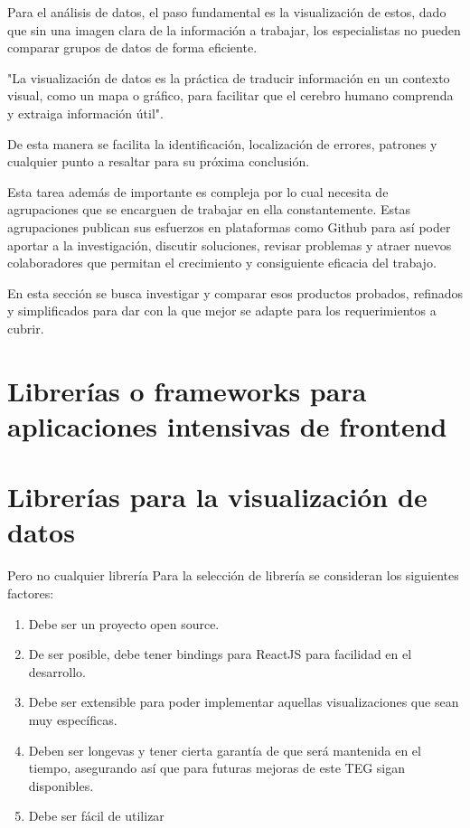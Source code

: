 Para el análisis de datos, el paso fundamental es la visualización de estos, dado que sin una imagen clara de la información a trabajar, los especialistas no pueden comparar grupos de datos de forma eficiente. 

"La visualización de datos es la práctica de traducir información en un contexto visual, como un mapa o gráfico, para facilitar que el cerebro humano comprenda y extraiga información útil". \cite{DefinitionDataViz}

De esta manera se facilita la identificación, localización de errores, patrones y cualquier punto a resaltar para su próxima conclusión.

Esta tarea además de importante es compleja por lo cual necesita de agrupaciones que se encarguen de trabajar en ella constantemente. Estas agrupaciones publican sus esfuerzos en plataformas como Github para así poder aportar a la investigación, discutir soluciones, revisar problemas y atraer nuevos colaboradores que permitan el crecimiento y consiguiente eficacia del trabajo.

En esta sección se busca investigar y comparar esos productos probados, refinados y simplificados para dar con la que mejor se adapte para los requerimientos a cubrir. 

\section{Librerías o frameworks para aplicaciones intensivas de frontend}

\section{Librerías para la visualización de datos}
Pero no cualquier librería 
Para la selección de librería se consideran los siguientes factores:

\begin{enumerate}
    \item {Debe ser un proyecto open source.}
    \item {De ser posible, debe tener bindings para ReactJS para facilidad en el desarrollo.}
    \item {Debe ser extensible para poder implementar aquellas visualizaciones que sean muy específicas.}
    \item {Deben ser longevas y tener cierta garantía de que será mantenida en el tiempo,
    asegurando así que para futuras mejoras de este TEG sigan disponibles.}
    \item {Debe ser fácil de utilizar}
\end{enumerate}

